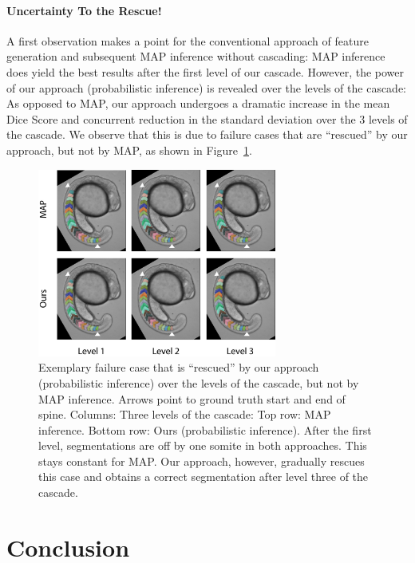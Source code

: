 \documentclass[10pt,twocolumn,letterpaper]{article}
\begin{document}
\paragraph{Uncertainty To the Rescue! }
%
A first observation makes a point for the conventional approach of feature generation and subsequent MAP inference without cascading: MAP inference does yield the best results after the first level of our cascade. However, the power of our approach (probabilistic inference) is revealed over the levels of the cascade: As opposed to MAP, our approach undergoes a dramatic increase in the mean Dice Score and concurrent reduction in the standard deviation over the 3 levels of the cascade. We observe that this is due to failure cases that are ``rescued'' by our approach, but not by MAP, as shown in Figure~\ref{fig:rescue}. 
%
\begin{figure}[t]
\begin{center}
\includegraphics[width=0.7\textwidth]{rescue.jpg} %
\caption{Exemplary failure case that is ``rescued'' by our approach (probabilistic inference) over the levels of the cascade, but not by MAP inference. Arrows point to ground truth start and end of spine. Columns: Three levels of the cascade: Top row: MAP inference. Bottom row: Ours (probabilistic inference). After the first level, segmentations are off by one somite in both approaches. This stays constant for MAP. Our approach, however, gradually rescues this case and obtains a correct segmentation after level three of the cascade.}
\label{fig:rescue}
\end{center}
\end{figure}
%

\section{Conclusion}

{\small


}
\end{document}
